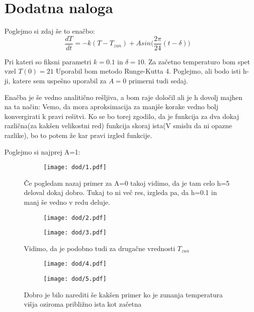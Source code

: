 \documentclass{article}
\begin{document}
\section{Dodatna naloga}

Poglejmo si zdaj še to enačbo:
\begin{equation*}
\frac{dT}{dt} = -k(T-T_{zun}) + Asin\Big(\frac{2\pi}{24}(t-\delta)\Big)
\end{equation*}

Pri kateri so fiksni parametri $k=0.1$ in $\delta = 10$. Za začetno temperaturo bom spet vzel $T(0) = 21$
Uporabil bom metodo Runge-Kutta 4. Poglejmo, ali bodo isti h-ji, katere sem uspešno uporabil za $A=0$ 
primerni tudi sedaj.

Enačba je še vedno analitično rešljiva, a bom raje določil ali je h dovolj majhen na ta način: Vemo, da mora aproksimacija za manjše korake vedno bolj konvergirati k pravi rešitvi. Ko se bo torej zgodilo, da je funkcija za dva dokaj različna(za kakšen velikostni red) funkcija skoraj ista(V smislu da ni opazne razlike), bo to potem že kar pravi izgled funkcije.

Poglejmo si najprej A=1:

\begin{figure}[H]
\centering
\begin{subfigure}{.5\textwidth}
\texttt{[image: dod/1.pdf]}
\end{subfigure}
\caption*{Če pogledam nazaj primer za A=0 takoj vidimo, da je tam celo h=5 deloval dokaj dobro. Tukaj to ni več res, izgleda pa, da h=0.1 in manj še vedno v redu deluje.}
\end{figure}

\begin{figure}[H]
\begin{subfigure}{.5\textwidth}
\texttt{[image: dod/2.pdf]}
\end{subfigure}
\begin{subfigure}{.5\textwidth}
\texttt{[image: dod/3.pdf]}
\end{subfigure}
\caption*{Vidimo, da je podobno tudi za drugačne vrednosti $T_{zun}$}
\end{figure}

\begin{figure}[H]
\begin{subfigure}{.5\textwidth}
\texttt{[image: dod/4.pdf]}
\end{subfigure}
\begin{subfigure}{.5\textwidth}
\texttt{[image: dod/5.pdf]}
\end{subfigure}
\caption*{Dobro je bilo narediti še kakšen primer ko je zunanja temperatura višja oziroma približno ista kot začetna}
\end{figure}
\end{document}

